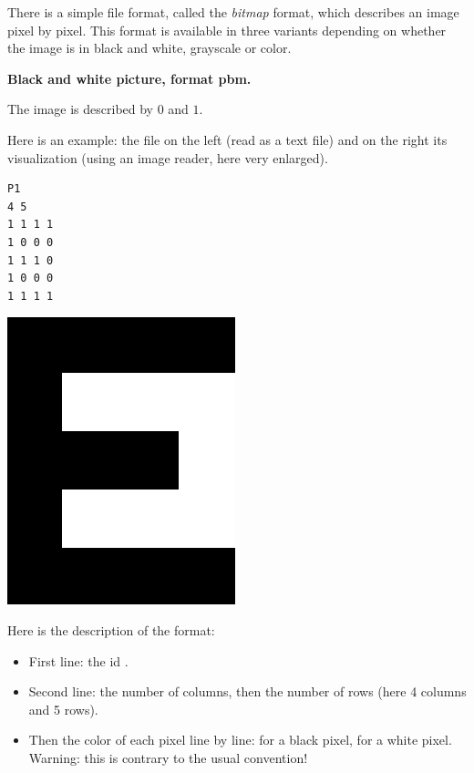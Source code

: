\documentclass[11pt,class=report,crop=false]{standalone}
\begin{document}
\begin{cours}


There is a simple file format, called the \emph{bitmap} format, which describes an image pixel by pixel. This format is available in three variants 
depending on whether the image is in black and white, grayscale or color.

\medskip

\textbf{Black and white picture, format \og{}pbm\fg{}.}

The image is described by $0$ and $1$.

Here is an example: the file  on the left (read as a text file) and on the right its visualization (using an image reader, here very enlarged).
\begin{center}
\begin{minipage}{0.3\textwidth}
\begin{lstlisting}
P1
4 5
1 1 1 1
1 0 0 0
1 1 1 0
1 0 0 0
1 1 1 1
\end{lstlisting}
\end{minipage}
\begin{minipage}{0.3\textwidth}
\includegraphics[scale=\myscale,scale=0.2]{screen-lesson-image_nb}
\end{minipage}
\end{center}

Here is the description of the format:
\begin{itemize}
  \item First line: the id .
  \item Second line: the number of columns, then the number of rows (here 4 columns and 5 rows).
  \item Then the color of each pixel line by line:  for a black pixel,  for a white pixel. Warning: this is contrary to the usual convention!
\end{itemize}  
  

\end{cours}
\end{document}
